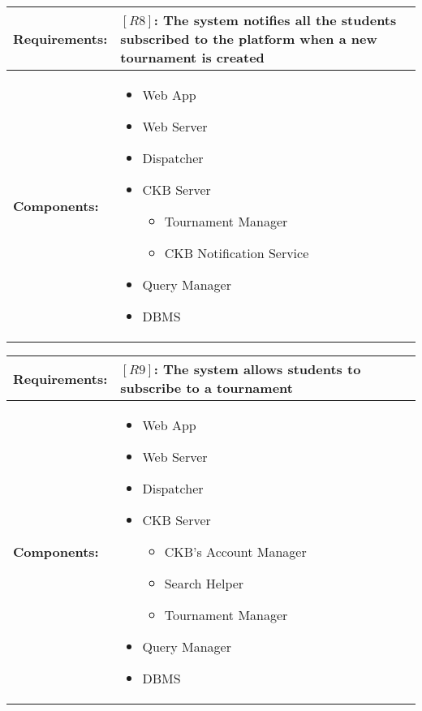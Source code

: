 \begin{table}[H]
  \centering
  \begin{tabularx}{\textwidth}{|p{3cm}|X|}
    \hline
    \textbf{Requirements:} &
    $[R8]$: The system notifies all the students subscribed to the platform when a new tournament is created
    \\
    \hline
    \textbf{Components:} & 
    \begin{itemize}
        \item Web App
        \item Web Server
        \item Dispatcher 
        \item CKB Server 
        \begin{itemize}
            \item Tournament Manager
            \item CKB Notification Service 
        \end{itemize}
        \item Query Manager
        \item DBMS
    \end{itemize}
    \\
    \hline
  \end{tabularx}
\end{table}



\begin{table}[H]
  \centering
  \begin{tabularx}{\textwidth}{|p{3cm}|X|}
    \hline
    \textbf{Requirements:} &
    $[R9]$: The system allows students to subscribe to a tournament
    \\
    \hline
    \textbf{Components:} & 
    \begin{itemize}
        \item Web App
        \item Web Server 
        \item Dispatcher
        \item CKB Server 
        \begin{itemize}
            \item CKB's Account Manager
            \item Search Helper
            \item Tournament Manager 
        \end{itemize}
        \item Query Manager
        \item DBMS
    \end{itemize}
    \\
    \hline
  \end{tabularx}
\end{table}


